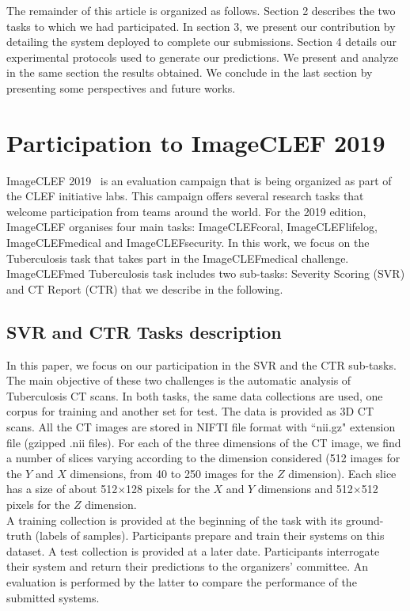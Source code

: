 \documentclass{llncs}
\begin{document}
The remainder of this article is organized as follows. Section 2 describes the two tasks to which we had participated. In section 3, we present our contribution by detailing the system deployed to complete our submissions. Section 4 details our experimental protocols used to generate our predictions. We present and analyze in the same section the results obtained. We conclude in the last section by presenting some perspectives and future works.

\section{Participation to ImageCLEF 2019}

ImageCLEF 2019~\cite{ImageCLEF19} is an evaluation campaign that is being organized as part of the CLEF initiative labs. This campaign offers several research tasks that welcome participation from teams around the world. For the 2019 edition, ImageCLEF organises four main tasks: ImageCLEFcoral, ImageCLEFlifelog, ImageCLEFmedical and ImageCLEFsecurity. In this work, we focus on the Tuberculosis task that takes part in the ImageCLEFmedical challenge. ImageCLEFmed Tuberculosis task includes two sub-tasks: Severity Scoring (SVR) and CT Report (CTR) that we describe in the following.

\subsection{SVR and CTR Tasks description}
In this paper, we focus on our participation in the SVR and the CTR sub-tasks. The main objective of these two challenges is the automatic analysis of Tuberculosis CT scans. In both tasks, the same data collections are used, one corpus for training and another set for test. The data is provided as 3D CT scans. All the CT images are stored in NIFTI file format with ``nii.gz" extension file (gzipped .nii files). For each of the three dimensions of the CT image, we find a number of slices varying according to the dimension considered (512 images for the $Y$ and $X$ dimensions, from 40 to 250 images for the $Z$ dimension). Each slice has a size of about 512$\times$128 pixels for the $X$ and $Y$ dimensions and 512$\times$512 pixels for the $Z$ dimension.\\

A training collection is provided at the beginning of the task with its ground-truth (labels of samples). Participants prepare and train their systems on this dataset. A test collection is provided at a later date. Participants interrogate their system and return their predictions to the organizers' committee. An evaluation is performed by the latter to compare the performance of the submitted systems.
\end{document}
